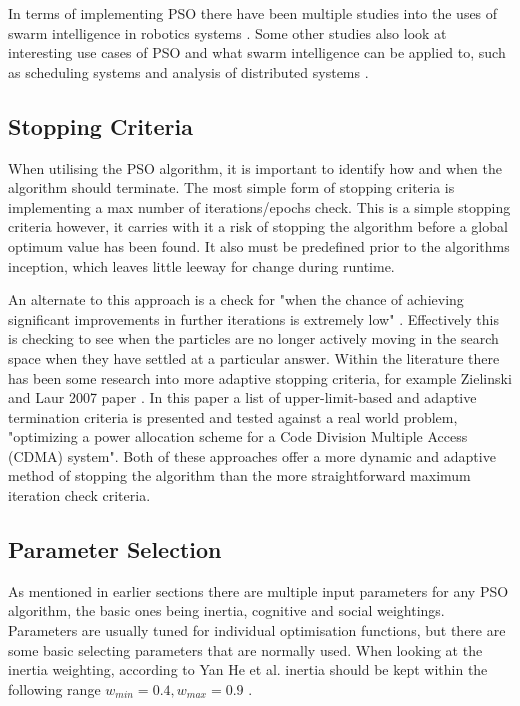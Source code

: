 \documentclass[oneside,12pt]{book}
\begin{document}
In terms of implementing PSO there have been multiple studies into the uses of swarm intelligence in robotics systems \cite{sa_nedjah_mourelle_2016, meng_gan_2008, hereford_2006}. Some other studies also look at interesting use cases of PSO and what swarm intelligence can be applied to, such as scheduling systems and analysis of distributed systems \cite{li_yang_su_lu_yu_2019, moradi_fotuhi-firuzabad_2008, nouiri_bekrar_jemai_niar_ammari_2015, sahin2007fault}. 

\subsection{Stopping Criteria}
When utilising the PSO algorithm, it is important to identify how and when the algorithm should terminate. The most simple form of stopping criteria is implementing a max number of iterations/epochs check. This is a simple stopping criteria however, it carries with it a risk of stopping the algorithm before a global optimum value has been found. It also must be predefined prior to the algorithms inception, which leaves little leeway for change during runtime.

An alternate to this approach is a check for "when the chance of achieving significant improvements in further iterations is extremely low" \cite{bassimir2020self}. Effectively this is checking to see when the particles are no longer actively moving in the search space when they have settled at a particular answer. Within the literature there has been some research into more adaptive stopping criteria, for example Zielinski and Laur 2007 paper \cite{zielinski2007stopping}. In this paper a list of upper-limit-based and adaptive termination criteria is presented and tested against a real world problem, "optimizing a power allocation scheme for a Code Division Multiple Access (CDMA) system"\cite{zielinski2007stopping}. Both of these approaches offer a more dynamic and adaptive method of stopping the algorithm than the more straightforward maximum iteration check criteria. 

\subsection{Parameter Selection}
As mentioned in earlier sections there are multiple input parameters for any PSO algorithm, the basic ones being inertia, cognitive and social weightings. Parameters are usually tuned for individual optimisation functions, but there are some basic selecting parameters that are normally used. When looking at the inertia weighting, according to Yan He et al. inertia should be kept within the following range \(w_{min} = 0.4, w_{max} = 0.9\) \cite{he2016parameters}.
\end{document}
